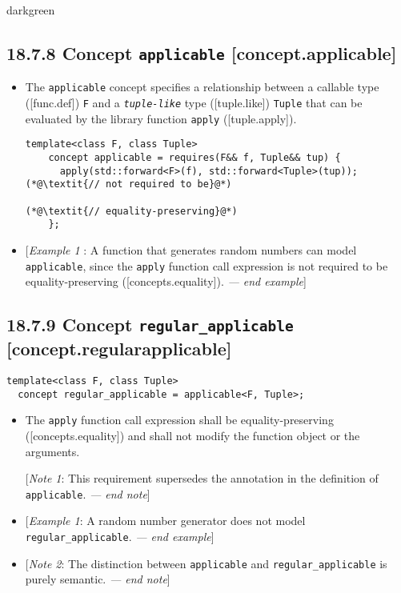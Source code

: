 \documentclass{article}
\begin{document}
\begin{color}{darkgreen}
\subsection*{18.7.8 Concept \texttt{applicable} [concept.applicable]}
\begin{itemize}
\item The \texttt{applicable} concept specifies a relationship between a
callable type ([func.def]) \texttt{F} and a \texttt{\textit{tuple-like}} type ([tuple.like])
\texttt{Tuple} that can be evaluated by the library function \texttt{apply} ([tuple.apply]).

\begin{lstlisting}[style=base]
  template<class F, class Tuple>
    concept applicable = requires(F&& f, Tuple&& tup) {
      apply(std::forward<F>(f), std::forward<Tuple>(tup)); (*@\textit{// not required to be}@*)
                                                           (*@\textit{// equality-preserving}@*)
    };
\end{lstlisting}

\item {[}\textit{Example 1 }: A function that generates random numbers can model
\texttt{applicable}, since the \texttt{apply} function call expression is not required to be
equality-preserving ([concepts.equality]). \textit{--- end example}{]}
\end{itemize}


\subsection*{18.7.9 Concept \texttt{regular\_applicable} [concept.regularapplicable]}

\begin{lstlisting}[style=base]
template<class F, class Tuple>
  concept regular_applicable = applicable<F, Tuple>;
\end{lstlisting}

\begin{itemize}
\item The \texttt{apply} function call expression shall be equality-preserving
  ([concepts.equality]) and shall not modify the function object or the arguments.

  {[}\textit{Note 1}: This requirement supersedes the annotation in the definition
  of \texttt{applicable}. \textit{--- end note}{]}

\item {[}\textit{Example 1}: A random number generator does not model
  \texttt{regular\_applicable}. \textit{--- end example}{]}

\item {[}\textit{Note 2}: The distinction between \texttt{applicable} and
  \texttt{regular\_applicable} is purely semantic. \textit{--- end note}{]}
\end{itemize}
\end{color}
\end{document}

